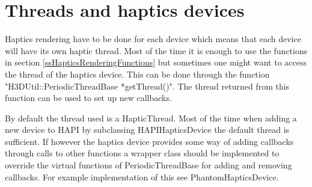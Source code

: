 \section{Threads and haptics devices}
Haptics rendering have to be done for each device which means that each device
will have its own haptic thread. Most of the time it is enough to use the
functions in section \ref{ssHapticsRenderingFunctions} but sometimes one might
want to access the thread of the haptics device. This can be done through the
function "H3DUtil::PeriodicThreadBase *getThread()". The thread returned from
this function can be used to set up new callbacks.

By default the thread used is a HapticThread. Most of the time when adding a
new device to HAPI by subclassing HAPIHapticsDevice the default thread is
sufficient. If however the haptics device provides some way of adding callbacks
through calls to other functions a wrapper class should be implemented
to override the virtual functions of PeriodicThreadBase for adding and removing
callbacks. For example implementation of this see PhantomHapticsDevice.